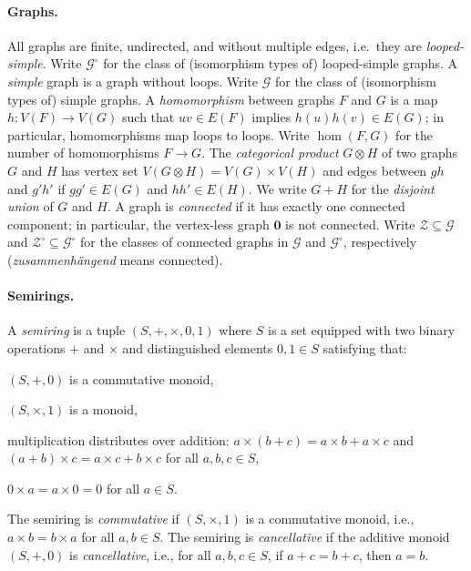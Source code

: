 \documentclass[11pt]{scrartcl}
\theoremstyle{definition}
\theoremstyle{plain}
\theoremstyle{remark}
\newcommand{\lG}{\mathcal{G}^\circ}
\newcommand{\G}{\mathcal{G}}
\newcommand{\lZ}{\mathcal{Z}^\circ}
\newcommand{\Z}{\mathcal{Z}}
\begin{document}
	\paragraph{Graphs.} All graphs are finite, undirected, and without multiple edges, i.e.\ they are \emph{looped-simple}.
	Write $\lG$ for the class of (isomorphism types of) looped-simple graphs.
	A \emph{simple} graph is a graph without loops.
    Write $\G$ for the class of (isomorphism types of) simple graphs.
	A \emph{homomorphism} between graphs $F$ and $G$ is a map $h \colon V(F) \to V(G)$ such that $uv \in E(F)$ implies $h(u)h(v) \in E(G)$;
	in particular, homomorphisms map loops to loops.
    Write $\hom(F, G)$ for the number of homomorphisms $F \to G$.
	The \emph{categorical product} $G \otimes H$ of two graphs $G$ and $H$ has vertex set $V(G \otimes H) = V(G) \times V(H)$ and edges between $gh$ and  $ g'h'$
	if $gg' \in E(G)$ and $hh' \in E(H)$.
	We write $G + H$ for the \emph{disjoint union} of $G$ and $H$.
	A graph is \emph{connected} if it has exactly one connected component; in particular, the vertex-less graph $\boldsymbol 0$ is not connected.
    Write $\Z \subseteq \G$ and $\lZ \subseteq \lG$ for the classes of connected graphs in $\G$ and $\lG$, respectively (\emph{zusammenhängend} means connected).

	\paragraph{Semirings.}
	A \emph{semiring} is a tuple $(S, +, \times, 0, 1)$
	where $S$ is a set equipped with two binary operations $+$ and $\times$ and distinguished elements $0,1 \in S$ satisfying that:
	\begin{assertions}
		\item $(S, +, 0)$ is a commutative monoid,
		\item $(S, \times,1)$ is a monoid,
		\item multiplication distributes over addition: $a \times (b + c) =
		a \times b + a \times c$ and $(a + b) \times c = a \times c + b \times c$
		for all $a, b, c \in S$,
		\item $0 \times a = a \times 0= 0$ for all $a \in S$.
	\end{assertions}
	The semiring is \emph{commutative} if $(S, \times, 1)$ is a commutative monoid, i.e., $a \times b = b \times a$ for all $a, b\in S$.
	The semiring is \emph{cancellative} 
	if the additive monoid $(S, +, 0)$ is \emph{cancellative}, i.e., for all $a, b, c \in S$, if $a + c = b + c$, then $a = b$.
\end{document}

